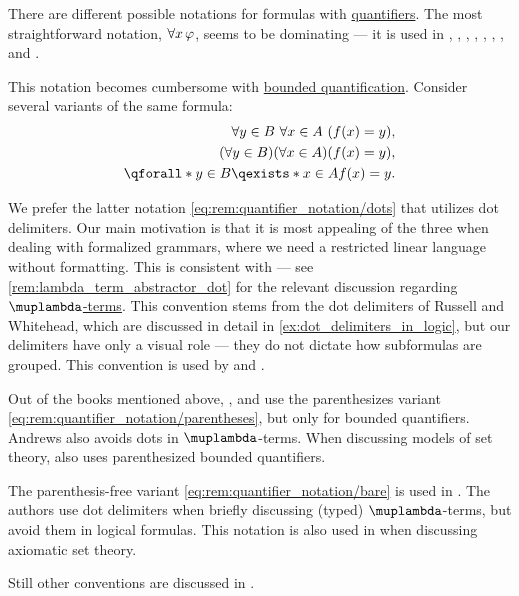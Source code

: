 \begin{remark}\label{rem:quantifier_notation}
  There are different possible notations for formulas with \hyperref[con:predicate_logic/quantifiers]{quantifiers}. The most straightforward notation, \( \mathinner{\forall x} \varphi \), seems to be dominating --- it is used in
  \cite[ch. 2]{Hinman2005Logic},
  \cite[ch. 2]{VanDalen2004LogicAndStructure},
  \cite[ch. II]{Kleene2002Logic},
  \cite{TroelstraSchwichtenberg2000BasicProofTheory},
  \cite[ch. 2]{Andrews2002Logic},
  \cite[\S I.9]{КолмогоровДрагалин2006ЛогикаВведение},
  \cite[def. 2.1.6]{Герасимов2014Вычислимость},
  \cite[ch. 3]{ШеньВерещагин2017ЯзыкиИИсчисления} and
  \cite[ch. II]{Эдельман1975Логика}.

  This notation becomes cumbersome with \hyperref[con:predicate_logic/relativization]{bounded quantification}. Consider several variants of the same formula:
  \begin{align}
    \forall {y \in B} \mathinner{\space} \forall {x \in A} \mathinner{\space} (f(x) = y), \label{eq:rem:quantifier_notation/bare} \\
    (\forall {y \in B}) (\forall {x \in A}) (f(x) = y), \label{eq:rem:quantifier_notation/parentheses} \\
    \qforall* {y \in B} \qexists* {x \in A} f(x) = y. \label{eq:rem:quantifier_notation/dots}
  \end{align}

  We prefer the latter notation \eqref{eq:rem:quantifier_notation/dots} that utilizes dot delimiters. Our main motivation is that it is most appealing of the three when dealing with formalized grammars, where we need a restricted linear language without formatting. This is consistent with  --- see \cref{rem:lambda_term_abstractor_dot} for the relevant discussion regarding \hyperref[def:lambda_term]{\( \muplambda \)-terms}. This convention stems from the dot delimiters of Russell and Whitehead, which are discussed in detail in \cref{ex:dot_delimiters_in_logic}, but our delimiters have only a visual role --- they do not dictate how subformulas are grouped. This convention is used by \textcite{Mimram2020ProgramEqualsProof} and \textcite{Farmer2008STTVirtues}.

  Out of the books mentioned above, \cite[def. 2.5.12]{VanDalen2004LogicAndStructure}, \cite[45]{Mendelson2015Logic} and \cite[79]{Andrews2002Logic} use the parenthesizes variant \eqref{eq:rem:quantifier_notation/parentheses}, but only for bounded quantifiers. Andrews also avoids dots in \( \muplambda \)-terms. When discussing models of set theory, \cite[ch. 12]{Jech2006SetTheory} also uses parenthesized bounded quantifiers.

  The parenthesis-free variant \eqref{eq:rem:quantifier_notation/bare} is used in \cite[def. 11.5.4]{TroelstraSchwichtenberg2000BasicProofTheory}. The authors use dot delimiters when briefly discussing (typed) \( \muplambda \)-terms, but avoid them in logical formulas. This notation is also used in \cite{Kunen2013SetTheory} when discussing axiomatic set theory.

  Still other conventions are discussed in \cite{MathSE:standards_for_quantifier_notation}.
\end{remark}

